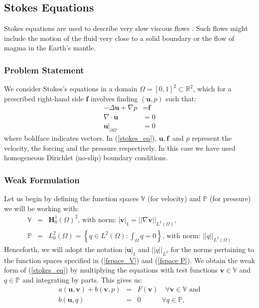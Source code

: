 \documentclass[12pt,a4paper]{article}
\theoremstyle{definition}
\begin{document}
\subsection{Stokes Equations}
Stokes equations are used to describe very slow viscous flows .  Such flows might include the motion of the fluid very close to a solid boundary or the flow of magma in the Earth's mantle.  
\subsubsection{Problem Statement}
We consider Stokes's equations in a domain $\Omega = \left[0,1\right]^2 \subset \mathbb{R}^2$, which for a prescribed right-hand side $\textbf{f}$ involves finding $\left(\textbf{u},p\right)$ such that:
\begin{equation}\label{stokes_eq}
\begin{aligned}
	-\Delta\textbf{u} + \nabla p &= \textbf{f} \\ 
	\nabla\cdot \textbf{u}&= 0\\ 
\textbf{u}|_{\partial\Omega}&=0 
\end{aligned}
\end{equation}
where boldface indicates vectors.  In (\ref{stokes_eq}), $\textbf{u},\, \textbf{f}$ and $p$ represent the velocity, the forcing and the pressure respectively.  In this case we have used homogeneous Dirichlet (no-slip) boundary conditions. 
\subsubsection{Weak Formulation}\label{weak-form-stokes}

Let us begin by defining the  function spaces $\mathbb{V}$ (for velocity) and $\mathbb{P}$ (for pressure) we will be working with:
\begin{eqnarray}\label{fspace_V}
\mathbb{V}&=&\textbf{H}^1_0\left(\Omega\right)^2\text{, with norm: } \left|\textbf{v}\right|_{1}=\left|\left|\nabla\textbf{v}\right|\right|_{L^2\left(\Omega\right)}, \\\label{fspace P}
\mathbb{P}&=&L^2_0\left(\Omega\right)=\left\lbrace q\in L^2\left(\Omega\right): \int_\Omega q=0\right\rbrace\text{, with norm: } \left|\left|q\right|\right|_{L^2\left(\Omega\right)}
\end{eqnarray}
 Henceforth, we will adopt the notation $\left|\textbf{u}\right|_1$ and $\left|\left|q\right|\right|_{L^2}$ for the norms pertaining to the function spaces specified in (\ref{fspace_V}) and (\ref{fspace P}).  
We obtain the weak form of (\ref{stokes_eq}) by multiplying the equations with test functions $\textbf{v}\in \mathbb{V}$ and $q\in\mathbb{P}$ and integrating by parts.  This gives us:
\begin{eqnarray}\label{form-a}
a\left(\textbf{u},\textbf{v}\right) + b\left(\textbf{v},p\right) &=& F\left(\textbf{v}\right)\quad \forall 
\textbf{v} \in \mathbb{V} \text{ and} \\ \label{form-b}
b\left(\textbf{u},q\right)&=&0 \quad \quad\quad\forall q \in \mathbb{P},
\end{eqnarray}
\end{document}
